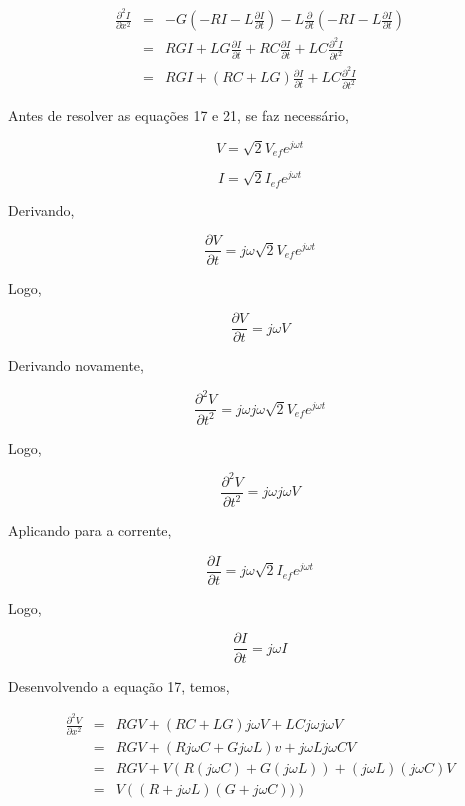 \documentclass[a4paper, 10pt]{article}
\begin{document}
\begin{eqnarray}
\frac{\partial^2 I}{\partial x^2} &=& -G \left( -R I -L \frac{\partial I}{\partial t}\right) - L \frac{\partial}{\partial t}\left(-R I - L \frac{\partial I}{\partial t}\right) \\
&=& R G I + L G \frac{\partial I}{\partial t} + R C \frac{\partial I}{\partial t} + L C \frac{\partial^2 I}{\partial t^2}\\
&=& R G I + (R C + L G)\frac{\partial I}{\partial t} + L C \frac{\partial^2 I}{\partial t^2}
\end{eqnarray}

Antes de resolver as equações 17 e 21, se faz necessário,

\begin{equation}
V = \sqrt{2} V_{ef} e^{j \omega t}
\end{equation}

\begin{equation}
I = \sqrt{2} I_{ef} e^{j \omega t}
\end{equation}

Derivando,

\begin{equation}
\frac{\partial V}{\partial t} = j \omega \sqrt{2} V_{ef} e^{j \omega t}
\end{equation}

Logo,

$$
\frac{\partial V}{\partial t} = j \omega V
$$

Derivando novamente,

\begin{equation}
\frac{\partial^2 V}{\partial t^2} = j \omega j \omega \sqrt{2} V_{ef} e^{j \omega t}
\end{equation}

Logo,

$$
\frac{\partial^2 V}{\partial t^2} = j \omega j \omega V
$$

Aplicando para a corrente,

\begin{equation}
\frac{\partial I}{\partial t} = j \omega \sqrt{2} I_{ef} e^{j \omega t}
\end{equation}

Logo,

$$
\frac{\partial I}{\partial t} = j \omega I
$$

Desenvolvendo a equação 17, temos,

\begin{eqnarray}
\frac{\partial^2 V}{\partial x^2} &=& R G V + (R C + L G)j \omega V + L C j \omega j \omega V \nonumber\\
&=&R G V + (R j \omega C + G j \omega L) v + j \omega L j \omega C V \nonumber\\
&=&R G V + V (R(j \omega C) +  G(j \omega L)) + (j \omega L)(j \omega C) V\nonumber\\
&=&V \left( (R + j \omega L) (G + j \omega C))\right) 
\end{eqnarray}
\end{document}

